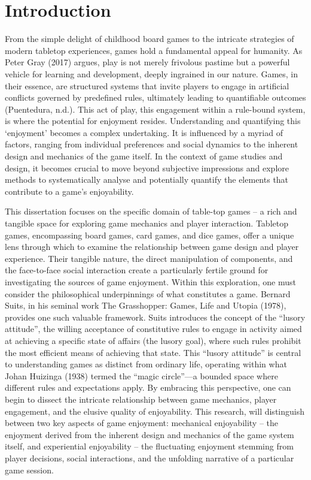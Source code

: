 \chapter{Introduction}
From the simple delight of childhood board games to the intricate strategies of modern tabletop experiences, games hold a fundamental appeal for humanity. As Peter Gray (2017)  argues, play is not merely frivolous pastime but a powerful vehicle for learning and development, deeply ingrained in our nature. Games, in their essence, are structured systems that invite players to engage in artificial conflicts governed by predefined rules, ultimately leading to quantifiable outcomes (Puentedura, n.d.). This act of play, this engagement within a rule-bound system, is where the potential for enjoyment resides. Understanding and quantifying this ‘enjoyment’ becomes a complex undertaking. It is influenced by a myriad of factors, ranging from individual preferences and social dynamics to the inherent design and mechanics of the game itself. In the context of game studies and design, it becomes crucial to move beyond subjective impressions and explore methods to systematically analyse and potentially quantify the elements that contribute to a game's enjoyability.

This dissertation focuses on the specific domain of table-top games – a rich and tangible space for exploring game mechanics and player interaction. Tabletop games, encompassing board games, card games, and dice games, offer a unique lens through which to examine the relationship between game design and player experience. Their tangible nature, the direct manipulation of components, and the face-to-face social interaction create a particularly fertile ground for investigating the sources of game enjoyment. Within this exploration, one must consider the philosophical underpinnings of what constitutes a game. Bernard Suits, in his seminal work The Grasshopper: Games, Life and Utopia (1978), provides one such valuable framework. Suits introduces the concept of the ``lusory attitude'', the willing acceptance of constitutive rules to engage in activity aimed at achieving a specific state of affairs (the lusory goal), where such rules prohibit the most efficient means of achieving that state. This ``lusory attitude'' is central to understanding games as distinct from ordinary life, operating within what Johan Huizinga (1938) termed the ``magic circle''—a bounded space where different rules and expectations apply. By embracing this perspective, one can begin to dissect the intricate relationship between game mechanics, player engagement, and the elusive quality of enjoyability. This research,  will distinguish between two key aspects of game enjoyment: mechanical enjoyability – the enjoyment derived from the inherent design and mechanics of the game system itself, and experiential enjoyability – the fluctuating enjoyment stemming from player decisions, social interactions, and the unfolding narrative of a particular game session.

